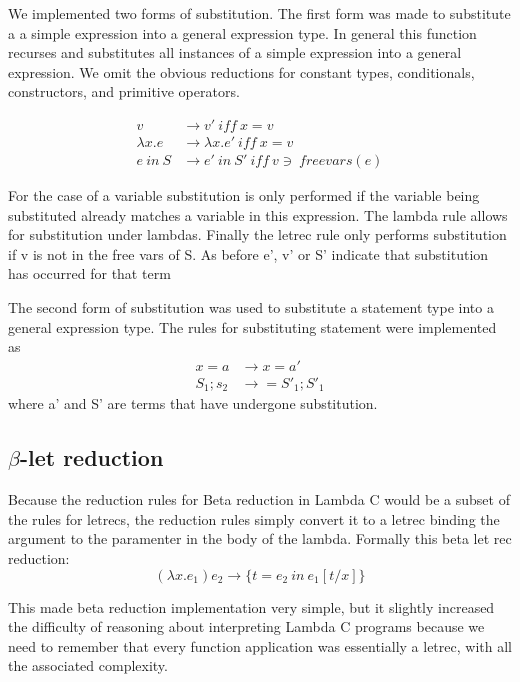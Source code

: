 \documentclass[preprint, 10pt]{sigplanconf}
\begin{document}
We implemented two forms of substitution. The first form was made to substitute a a simple expression into a general expression type. In general this function recurses and substitutes all instances of a simple expression into a general expression. We omit the obvious reductions for constant types, conditionals, constructors, and primitive 
operators.   

\begin{align}
v &\rightarrow v'\ iff\ x = v\\
\lambda x.e &\rightarrow \lambda x.e'\ iff\ x = v\\
{ e\ in\ S } &\rightarrow {e'\ in\ S'}\ iff\ v \ni\ freevars(e)
\end{align}

For the case of a variable substitution is only performed if the variable being substituted already matches a variable in this expression. The lambda rule allows for substitution under lambdas. Finally the letrec rule only performs substitution if v is not in the free vars of S. As before e', v' or S' indicate that substitution has occurred for that term 

The second form of substitution was used to substitute a statement type into a general expression type. The rules for substituting statement were implemented as
\begin{align}
x=a &\rightarrow x=a'\\
S_{1} ; s_{2} &\rightarrow = S'_{1} ; S'_{1}
\end{align}
where a' and S' are terms that have undergone substitution. 

\subsection{$\beta$-let reduction}
Because the reduction rules for Beta reduction in Lambda C would be a subset of the rules for letrecs,  the reduction rules simply convert it to a letrec binding the argument to the paramenter in the body of the lambda. Formally this beta let rec reduction: 
\begin{equation}
(\lambda x.e_{1})e_{2} \rightarrow \lbrace t = e_{2}\ in\ e_{1}[t/x] \rbrace
\end{equation}

This made beta reduction implementation very simple, but it slightly increased the difficulty of reasoning about interpreting Lambda C programs because we need to remember that every function application was essentially a letrec, with all the associated complexity.
\end{document}
